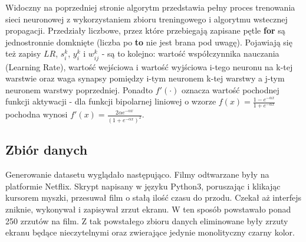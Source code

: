 \documentclass[12pt,a4paper]{article}
\begin{document}
Widoczny na poprzedniej stronie algorytm przedstawia pełny proces trenowania sieci neuronowej z wykorzystaniem zbioru treningowego i algorytmu wstecznej propagacji. Przedziały liczbowe, przez które przebiegają zapisane pętle \textbf{for} są jednostronnie domknięte (liczba po \textbf{to} nie jest brana pod uwagę). Pojawiają się też zapisy $LR$, $s^k_i$, $y^k_i$ i $w^{k}_{ij}$ - są to kolejno: wartość współczynnika nauczania (Learning Rate), wartość wejściowa i wartość wyjściowa i-tego neuronu na k-tej warstwie oraz waga synapsy pomiędzy i-tym neuronem k-tej warstwy a j-tym neuronem warstwy poprzedniej. Ponadto $f'(\cdot)$ oznacza wartość pochodnej funkcji aktywacji - dla funkcji bipolarnej liniowej o wzorze $f(x) = \frac{1 - e^{-\alpha x}}{1 + e^{-\alpha x}}$ pochodna wynosi $f'(x) = \frac{2 \alpha e^{-\alpha x}}{(1 + e^{-\alpha x})^2}$.

	\subsection*{Zbiór danych}
	
    \hspace{15pt} Generowanie datasetu wyglądało następująco. Filmy odtwarzane były na platformie Netflix. Skrypt napisany w języku Python3, poruszając i klikając kursorem myszki, przesuwał film o stałą ilość czasu do przodu. Czekał aż interfejs zniknie, wykonywał i zapisywał zrzut ekranu. W ten sposób powstawało ponad 250 zrzutów na film. Z tak powstałego zbioru danych eliminowane były zrzuty ekranu będące nieczytelnymi oraz zwierające jedynie monolityczny czarny kolor.
	
\end{document}
